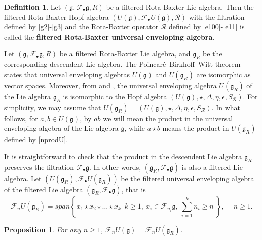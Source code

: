 \documentclass[12pt]{amsart}
\newtheorem{pro}[thm]{Proposition}
\theoremstyle{definition}   %
\newtheorem{defi}[thm]{Definition}
\newcommand{\g}{\mathfrak g}
\newcommand{\huaR}{\mathcal{R}}
\newcommand{\huaF}{\mathcal{F}}
\begin{document}
\begin{defi}
    Let $(\g, \huaF_{\bullet}\g, R)$ be a filtered Rota-Baxter Lie algebra. Then the filtered Rota-Baxter Hopf algebra $(U(\g),\huaF_{\bullet}U(\g),\huaR)$ with the filtration defined by \eqref{g2}-\eqref{g3} and the Rota-Baxter operator $\huaR$ defined by \eqref{e100}-\eqref{e11} is called the  {\bf filtered Rota-Baxter universal enveloping algebra}.
\end{defi}


Let $(\g, \huaF_{\bullet}\g, R)$ be a filtered Rota-Baxter Lie algebra, and $\g_R$ be the corresponding descendent Lie algebra. The
Poincar\'e--Birkhoff--Witt theorem states that universal enveloping algebras $U(\g)$ and $U(\g_R)$ are isomorphic as vector spaces. Moreover, from \cite[Theorem 4]{Goncharov} and \cite[Theorem 3.4]{ELM}, the universal enveloping algebra $U(\g_R)$ of the Lie algebra $\g_R$ is isomorphic to the Hopf algebra $(U(\g),\star,\Delta,\eta,\epsilon, S_{\huaR})$. For simplicity, we may assume that $U(\g_R)=(U(\g),\star,\Delta,\eta,\epsilon, S_{\huaR})$. In what follows, for $a,b\in U(\g)$, by $ab$ we will mean the product in the universal enveloping algebra of the Lie algebra $\g$,  while $a\star b$ means the product in $U(\g_R)$
defined by \eqref{nprodU}.


It is straightforward to check that the product in the descendent Lie algebra $\g_R$ preserves the filtration $\huaF_{\bullet}\g$. In other words, $(\g_R,\huaF_{\bullet}\g)$ is also a filtered Lie algebra. Let $(U(\g_R),\huaF_{\bullet}U(\g_R))$ be the filtered universal enveloping algebra of the filtered Lie algebra $(\g_R,\huaF_{\bullet}\g)$, that is
$$
\huaF_nU(\g_R)=span \left\{x_1\star x_2\star\ldots \star x_k |\ k\geq 1,\
x_i\in \huaF_{n_i}\g,\
\sum_{i=1}^k n_i\ge n\   \right\},\quad\ n\geq 1.
$$
\begin{pro}\label{filt}
For any $n\geq 1$, $\huaF_nU(\g)=\huaF_nU(\g_R)$.
\end{pro}
\end{document}
